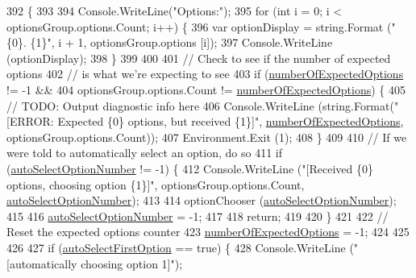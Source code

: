 \begin{DoxyCode}
392             \{
393 
394                 Console.WriteLine(\textcolor{stringliteral}{"Options:"});
395                 \textcolor{keywordflow}{for} (\textcolor{keywordtype}{int} i = 0; i < optionsGroup.options.Count; i++) \{
396                     var optionDisplay = string.Format (\textcolor{stringliteral}{"\{0\}. \{1\}"}, i + 1, optionsGroup.options [i]);
397                     Console.WriteLine (optionDisplay);
398                 \}
399 
400 
401                 \textcolor{comment}{// Check to see if the number of expected options}
402                 \textcolor{comment}{// is what we're expecting to see}
403                 \textcolor{keywordflow}{if} (\hyperlink{a00044_a2e17937195ecd64d5d867d958c45d2c3}{numberOfExpectedOptions} != -1 &&
404                     optionsGroup.options.Count != \hyperlink{a00044_a2e17937195ecd64d5d867d958c45d2c3}{numberOfExpectedOptions}) \{
405                     \textcolor{comment}{// TODO: Output diagnostic info here}
406                     Console.WriteLine (string.Format(\textcolor{stringliteral}{"[ERROR: Expected \{0\} options, but received \{1\}]"}, 
      \hyperlink{a00044_a2e17937195ecd64d5d867d958c45d2c3}{numberOfExpectedOptions}, optionsGroup.options.Count));
407                     Environment.Exit (1);
408                 \}
409 
410                 \textcolor{comment}{// If we were told to automatically select an option, do so}
411                 \textcolor{keywordflow}{if} (\hyperlink{a00044_a34886671e91a1bf3fc225eeb67baced1}{autoSelectOptionNumber} != -1) \{
412                     Console.WriteLine (\textcolor{stringliteral}{"[Received \{0\} options, choosing option \{1\}]"}, 
      optionsGroup.options.Count, \hyperlink{a00044_a34886671e91a1bf3fc225eeb67baced1}{autoSelectOptionNumber});
413 
414                     optionChooser (\hyperlink{a00044_a34886671e91a1bf3fc225eeb67baced1}{autoSelectOptionNumber});
415 
416                     \hyperlink{a00044_a34886671e91a1bf3fc225eeb67baced1}{autoSelectOptionNumber} = -1;
417 
418                     \textcolor{keywordflow}{return};
419 
420                 \}
421 
422                 \textcolor{comment}{// Reset the expected options counter}
423                 \hyperlink{a00044_a2e17937195ecd64d5d867d958c45d2c3}{numberOfExpectedOptions} = -1;
424 
425 
426 
427                 \textcolor{keywordflow}{if} (\hyperlink{a00044_a09a552ee9ff58cb3c995f8ecba1592b6}{autoSelectFirstOption} == \textcolor{keyword}{true}) \{
428                     Console.WriteLine (\textcolor{stringliteral}{"[automatically choosing option 1]"});

\end{DoxyCode}
